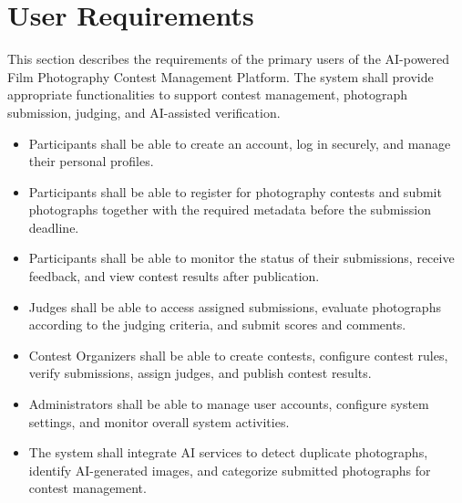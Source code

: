 \section{User Requirements}
This section describes the requirements of the primary users of the AI-powered Film Photography Contest Management Platform. The system shall provide appropriate functionalities to support contest management, photograph submission, judging, and AI-assisted verification.
\begin{itemize}
    \item Participants shall be able to create an account, log in securely, and manage their personal profiles.
    \item Participants shall be able to register for photography contests and submit photographs together with the required metadata before the submission deadline.
    \item Participants shall be able to monitor the status of their submissions, receive feedback, and view contest results after publication.
    \item Judges shall be able to access assigned submissions, evaluate photographs according to the judging criteria, and submit scores and comments.
    \item Contest Organizers shall be able to create contests, configure contest rules, verify submissions, assign judges, and publish contest results.
    \item Administrators shall be able to manage user accounts, configure system settings, and monitor overall system activities.
    \item The system shall integrate AI services to detect duplicate photographs, identify AI-generated images, and categorize submitted photographs for contest management.
\end{itemize}
